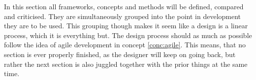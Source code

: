 In this section all frameworks, concepts and methods will be defined, compared and criticised. They are simultaneously grouped into the point in development they are to be used. This grouping though makes it seem like a design is a linear process, which it is everything but. The design process should as much as possible follow the idea of agile development in concept \ref{conc:agile}. This means, that no section is ever properly finished, as the designer will keep on going back, but rather the next section is also juggled together with the prior things at the same time.
\begin{concept} \label{conc:agile}  
  
\end{concept}

\begin{framework}[Y-Model] \label{fw:y_model} 
  
\end{framework}